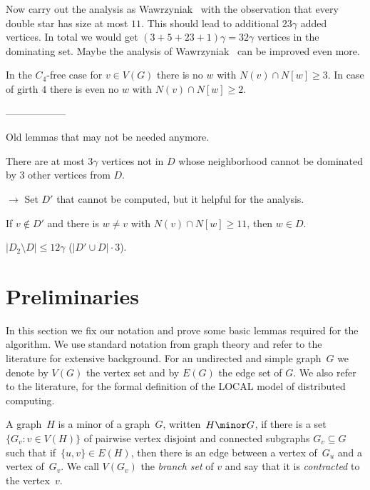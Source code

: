 Now carry out the analysis as Wawrzyniak~\cite{wawrzyniak2014strengthened}
with the observation that every double star has size at most $11$. This should
lead to additional $23\gamma$ added vertices. In total we would get
$(3+5+23+1)\gamma=32\gamma$ vertices in the dominating set. Maybe
the analysis of Wawrzyniak~\cite{wawrzyniak2014strengthened} can be
improved even more. 

In the $C_4$-free case for $v\in V(G)$ there is no $w$ with $N(v)\cap N[w]\geq 3$. 
In case of girth $4$ there is even no $w$ with $N(v)\cap N[w]\geq 2$. 

------------------ 

Old lemmas that may not be needed anymore. 

\begin{lemma}
There are at most $3\gamma$ vertices not in $D$ whose neighborhood cannot
be dominated by $3$ other vertices from $D$. 
\end{lemma}

$\rightarrow$ Set $D'$ that cannot be computed, but it helpful for the analysis. 

\begin{lemma}
If $v\not\in D'$ and there is $w\neq v$ with $N(v)\cap N[w]\geq 11$, 
then $w\in D$. 
\end{lemma}



\begin{corollary}
$|D_2\setminus D|\leq 12\gamma$ ($|D'\cup D|\cdot 3$). 
\end{corollary}


\section{Preliminaries}

In this section we fix our notation and prove some basic lemmas
required for the algorithm. We use standard notation from graph
theory and refer to the literature for extensive background. For an
undirected and simple graph~$G$ we denote by $V(G)$
the vertex set and by $E(G)$ the edge set of $G$. We also refer
to the literature, for the
formal definition of the LOCAL model of distributed computing.

A graph~$H$ is a minor of a graph~$G$, written~$H\minor G$, if
there is a set \mbox{$\{G_v :v\in V(H)\}$} of pairwise vertex disjoint and
connected subgraphs
$G_v\subseteq G$ such that if~$\{u,v\}\in E(H)$, then there is an edge
between a vertex of~$G_u$ and a vertex of~$G_v$. We call $V(G_v)$ the
\emph{branch set} of $v$ and say that it is
\emph{contracted} to the vertex~$v$.

